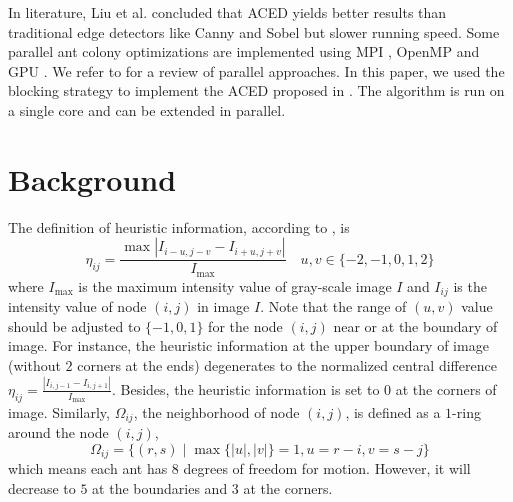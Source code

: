 \documentclass[letterpaper]{article}
\newcommand{\mypar}[1]{{\bf #1.}}
\begin{document}
In literature, Liu et al. \cite{LIU2015147} concluded that ACED yields better results than traditional edge detectors like Canny and Sobel but slower running speed. Some parallel ant colony optimizations are implemented using MPI \cite{RANDALL20021421}, OpenMP \cite{delisle2001parallel} and GPU \cite{dawson2014accelerating}. We refer to \cite{PEDEMONTE20115181} for a review of parallel approaches. In this paper, we used the blocking strategy to implement the ACED proposed in \cite{LIU2015147}. The algorithm is run on a single core and can be extended in parallel.    

\section{Background}\label{sec:background}

%
%
%
%
%
The definition of heuristic information, according to \cite{LIU2015147}, is
\begin{equation*}
\eta_{ij}=\frac{\max|I_{i-u,j-v}-I_{i+u,j+v}|}{I_{\max}} \quad u,v \in \{-2,-1,0,1,2\}
\end{equation*}
where $I_{\max}$ is the maximum intensity value of gray-scale image $I$ and $I_{ij}$ is the intensity value of node $(i,j)$ in image $I$. Note that the range of $(u,v)$ value should be adjusted to $\{-1,0,1\}$ for the node $(i,j)$ near or at the boundary of image. For instance, the heuristic information at the upper boundary of image (without $2$ corners at the ends) degenerates to the normalized central difference $\eta_{ij}=\frac{|I_{i,j-1}-I_{i,j+1}|}{I_{\max}}$. Besides, the heuristic information is set to $0$ at the corners of image. Similarly, $\Omega_{ij}$, the neighborhood of node $(i,j)$, is defined as a $1$-ring around the node $(i,j)$,
\begin{equation*}
\Omega_{ij}=\{(r,s)\mid\max\{|u|,|v|\}=1, u=r-i, v=s-j\}
\end{equation*}
which means each ant has $8$ degrees of freedom for motion. However, it will decrease to $5$ at the boundaries and $3$ at the corners.
\end{document}
